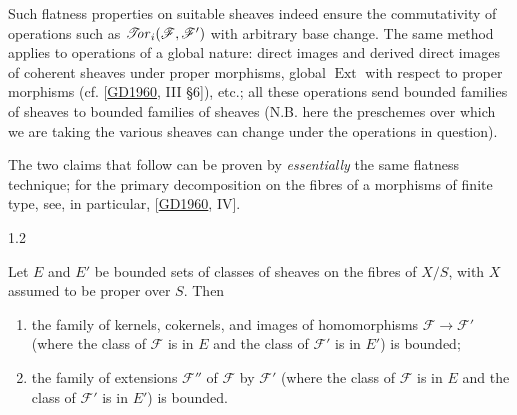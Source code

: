   Such flatness properties on suitable sheaves indeed ensure the commutativity of operations such as \(\mathscr {T}\kern  -2.75pt\mathit {or}_i(\mathscr {F},\mathscr {F}')\) with arbitrary base change.
  The same method applies to operations of a global nature:
  direct images and derived direct images of coherent sheaves under proper morphisms, global \(\operatorname {Ext}\) with respect to proper morphisms (cf. [\hyperref[GD1960]{GD1960}, III §6]), etc.;
  all these operations send bounded families of sheaves to bounded families of sheaves (N.B. here the preschemes over which we are taking the various sheaves can change under the operations in question).\par{}The two claims that follow can be proven by \emph{essentially} the same flatness technique;
  for the primary decomposition on the fibres of a morphisms of finite type, see, in particular, [\hyperref[GD1960]{GD1960}, IV].\begin{proposition}{1.2}\label{fga3.iv-1-proposition-1.2}\skipsinglepar\par{}Let \(E\) and \(E'\) be bounded sets of classes of sheaves on the fibres of \(X/S\), with \(X\) assumed to be proper over \(S\).
    Then

    
 \begin{enumerate}
      
 \item[i.]
        the family of kernels, cokernels, and images of homomorphisms \(\mathscr {F}\to \mathscr {F}'\) (where the class of \(\mathscr {F}\) is in \(E\) and the class of \(\mathscr {F}'\) is in \(E'\)) is bounded;
      

      
 \item[ii.]
        the family of extensions \(\mathscr {F}''\) of \(\mathscr {F}\) by \(\mathscr {F}'\) (where the class of \(\mathscr {F}\) is in \(E\) and the class of \(\mathscr {F}'\) is in \(E'\)) is bounded.
      


\end{enumerate}
\end{proposition}
